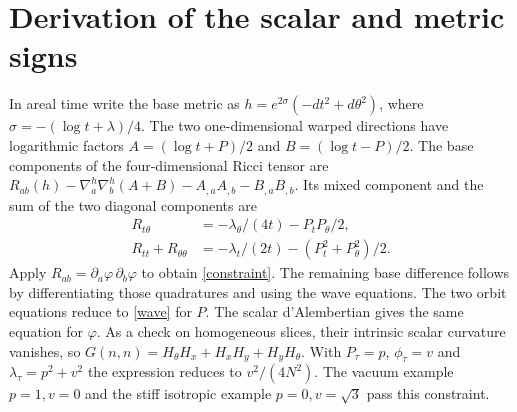 \section{Derivation of the scalar and metric signs}
In areal time write the base metric as $h=e^{2\sigma}(-dt^2+d\theta^2)$,
where $\sigma=-(\log t+\lambda)/4$.
The two one-dimensional warped directions have logarithmic
factors $A=(\log t+P)/2$ and $B=(\log t-P)/2$.
The base components of the four-dimensional Ricci tensor are
$R_{ab}(h)-\nabla^h_a\nabla^h_b(A+B)-A_{,a}A_{,b}-B_{,a}B_{,b}$.
Its mixed component and the sum of the two diagonal components are
\begin{align*}
 R_{t\theta}&=-\lambda_\theta/(4t)-P_tP_\theta/2,\\
 R_{tt}+R_{\theta\theta}
   &=-\lambda_t/(2t)-(P_t^2+P_\theta^2)/2 .
\end{align*}
Apply $R_{ab}=\partial_a\varphi\,\partial_b\varphi$ to obtain
\eqref{constraint}. The remaining base difference follows by
differentiating those quadratures and using the wave equations.
The two orbit equations reduce to \eqref{wave} for $P$.
The scalar d'Alembertian gives the same equation for $\varphi$.
As a check on homogeneous slices, their intrinsic scalar curvature
vanishes, so $G(n,n)=H_\theta H_x+H_xH_y+H_yH_\theta$.
With $P_\tau=p$, $\phi_\tau=v$ and $\lambda_\tau=p^2+v^2$
the expression reduces to $v^2/(4N^2)$. The vacuum example $p=1,v=0$
and the stiff isotropic example $p=0,v=\sqrt{3}$ pass this constraint.
